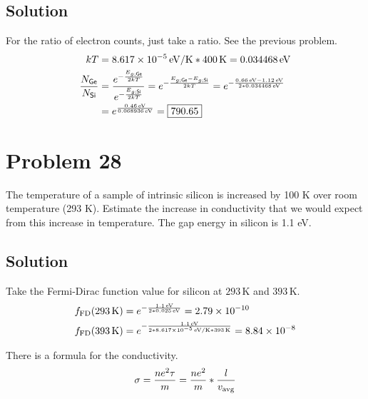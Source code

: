 \documentclass[12pt]{article}
\newcommand{\e}[1]{e^{#1}}
\newcommand{\E}[1]{\times 10^{#1}}
\begin{document}
    \subsection{Solution}
        For the ratio of electron counts, just take a ratio.
        See the previous problem.
        \begin{align}
            kT  &=  8.617\E{-5}\,\unit{\eV/\kelvin} * 400\,\unit{\kelvin}
                =   0.034468\,\unit{\eV}\\
            \frac{N_{\ce{Ge}}}{N_{\ce{Si}}} &= \frac{\e{-\frac{E_{g;\ce{Ge}}}{2kT}}}{\e{-\frac{E_{g;\ce{Si}}}{2kT}}}
                =   \e{-\frac{E_{g;\ce{Ge}} - E_{g;\ce{Si}}}{2kT}}
                =   \e{-\frac{0.66\,\unit{\eV} - 1.12\,\unit{\eV}}{2*0.034468\,\unit{\eV}}}\\
                &=  \e{\frac{0.46\,\unit{\eV}}{0.068936\,\unit{\eV}}}
                =   \boxed{790.65}
        \end{align}
    \pagebreak

\section{Problem 28} %
    The temperature of a sample of intrinsic silicon is increased by 100 K over room temperature (293 K). 
    Estimate the increase in conductivity that we would expect from this increase in temperature. 
    The gap energy in silicon is 1.1 eV.

    \subsection{Solution}
        Take the Fermi-Dirac function value for silicon at $293\,\unit{\kelvin}$ and $393\,\unit{\kelvin}$.
        \begin{align}
            f_{\rm FD}(293\,\unit{\kelvin}) &=  \e{-\frac{1.1\,\unit{\eV}}{2*0.025\,\unit{\eV}}}
                =   2.79\E{-10}\\
            f_{\rm FD}(393\,\unit{\kelvin}) &=  \e{-\frac{1.1\,\unit{\eV}}{2*8.617\E{-5}\,\unit{\eV/\kelvin} * 393\,\unit{\kelvin}}}
                =   8.84\E{-8}
        \end{align}

        There is a formula for the conductivity.
        \begin{equation}
            \sigma = \frac{ne^2\tau}{m} = \frac{ne^2}{m} * \frac{l}{v_{\rm avg}}
        \end{equation}
\end{document}
